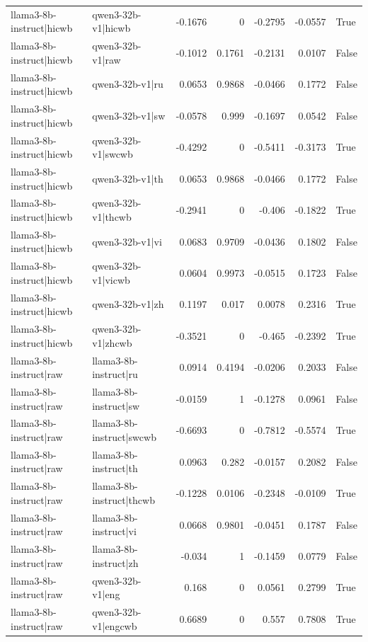 \begin{table}
\begin{tabular}{l l r r r r l}
llama3-8b-instruct|hicwb & qwen3-32b-v1|hicwb & -0.1676 & 0 & -0.2795 & -0.0557 & True \\
llama3-8b-instruct|hicwb & qwen3-32b-v1|raw & -0.1012 & 0.1761 & -0.2131 & 0.0107 & False \\
llama3-8b-instruct|hicwb & qwen3-32b-v1|ru & 0.0653 & 0.9868 & -0.0466 & 0.1772 & False \\
llama3-8b-instruct|hicwb & qwen3-32b-v1|sw & -0.0578 & 0.999 & -0.1697 & 0.0542 & False \\
llama3-8b-instruct|hicwb & qwen3-32b-v1|swcwb & -0.4292 & 0 & -0.5411 & -0.3173 & True \\
llama3-8b-instruct|hicwb & qwen3-32b-v1|th & 0.0653 & 0.9868 & -0.0466 & 0.1772 & False \\
llama3-8b-instruct|hicwb & qwen3-32b-v1|thcwb & -0.2941 & 0 & -0.406 & -0.1822 & True \\
llama3-8b-instruct|hicwb & qwen3-32b-v1|vi & 0.0683 & 0.9709 & -0.0436 & 0.1802 & False \\
llama3-8b-instruct|hicwb & qwen3-32b-v1|vicwb & 0.0604 & 0.9973 & -0.0515 & 0.1723 & False \\
llama3-8b-instruct|hicwb & qwen3-32b-v1|zh & 0.1197 & 0.017 & 0.0078 & 0.2316 & True \\
llama3-8b-instruct|hicwb & qwen3-32b-v1|zhcwb & -0.3521 & 0 & -0.465 & -0.2392 & True \\
llama3-8b-instruct|raw & llama3-8b-instruct|ru & 0.0914 & 0.4194 & -0.0206 & 0.2033 & False \\
llama3-8b-instruct|raw & llama3-8b-instruct|sw & -0.0159 & 1 & -0.1278 & 0.0961 & False \\
llama3-8b-instruct|raw & llama3-8b-instruct|swcwb & -0.6693 & 0 & -0.7812 & -0.5574 & True \\
llama3-8b-instruct|raw & llama3-8b-instruct|th & 0.0963 & 0.282 & -0.0157 & 0.2082 & False \\
llama3-8b-instruct|raw & llama3-8b-instruct|thcwb & -0.1228 & 0.0106 & -0.2348 & -0.0109 & True \\
llama3-8b-instruct|raw & llama3-8b-instruct|vi & 0.0668 & 0.9801 & -0.0451 & 0.1787 & False \\
llama3-8b-instruct|raw & llama3-8b-instruct|zh & -0.034 & 1 & -0.1459 & 0.0779 & False \\
llama3-8b-instruct|raw & qwen3-32b-v1|eng & 0.168 & 0 & 0.0561 & 0.2799 & True \\
llama3-8b-instruct|raw & qwen3-32b-v1|engcwb & 0.6689 & 0 & 0.557 & 0.7808 & True \\

\end{tabular}
\end{table}
